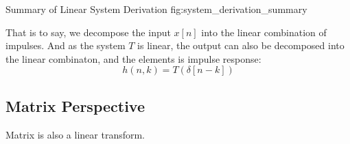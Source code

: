                 {Summary of Linear System Derivation}
                {fig:system_derivation_summary}

        That is to say, we decompose the input $x[n]$ into the linear combination of impulses.
        And as the system $T$ is linear, the output can also be decomposed into the linear combinaton, 
        and the elements is impulse response:
                    \begin{equation}
                        h(n,k) = T(\delta[n-k])
                    \end{equation} 

        \subsection{Matrix Perspective}
        Matrix is also a linear transform.

